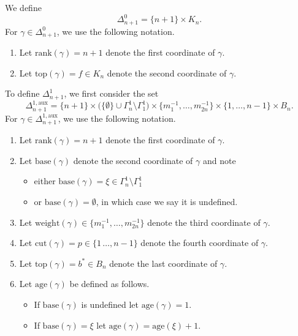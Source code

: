 \documentclass[11pt]{amsart}
\theoremstyle{definition}
\numberwithin{equation}{section}
\begin{document}
We define
\[\Delta_{n+1}^0 = \{n+1\}\times K_n.\]
For $\gamma\in\Delta_{n+1}^0$, we use the following notation.
\begin{enumerate}[label=(\arabic*)]

\item Let $\mathrm{rank}(\gamma) = n+1$ denote the first coordinate of $\gamma$.

\item Let $\mathrm{top}(\gamma) = f\in K_n$ denote the second coordinate of $\gamma$.

\end{enumerate}

To define $\Delta_{n+1}^1$, we first consider the set
\[\Delta_{n+1}^{1,\mathrm{aux}} = \{n+1\}\times \big(\{\emptyset\}\cup\Gamma^1_n\setminus\Gamma_1^1\big)\times\{m^{-1}_1,\ldots,m^{-1}_{2n}\}\times \{1,\dots,n-1\}\times B_n.\]
For $\gamma\in\Delta_{n+1}^{1,\mathrm{aux}}$, we use the following notation.
\begin{enumerate}[label=(\arabic*),resume]
    
    \item Let $\mathrm{rank}(\gamma) = n+1$ denote the first coordinate of $\gamma$.
    
    \item Let $\mathrm{base}(\gamma)$ denote the second coordinate of $\gamma$ and note
    \begin{itemize}
        \item either $\mathrm{base}(\gamma)=\xi\in\Gamma^1_n\setminus\Gamma_1^1$
        \item or $\mathrm{base}(\gamma) = \emptyset$, in which case we say it is undefined.
    \end{itemize}   
    
    \item Let $\mathrm{weight}(\gamma)\in\{m^{-1}_1,\ldots,m^{-1}_{2n}\}$ denote the third coordinate of $\gamma$.

    \item Let $\mathrm{cut}(\gamma) = p\in\{1\,\ldots,n-1\}$ denote the fourth coordinate of $\gamma$.

    \item Let $\mathrm{top}(\gamma) = b^*\in B_n$ denote the last coordinate of $\gamma$.

    \item Let $\mathrm{age}(\gamma)$ be defined as follows.
    \begin{itemize}
        \item If $\mathrm{base}(\gamma)$ is undefined let $\mathrm{age}(\gamma) = 1$.
        \item If $\mathrm{base}(\gamma) = \xi$ let $\mathrm{age}(\gamma) =\mathrm{age}(\xi)+ 1$.
    \end{itemize}        
\end{enumerate}
\end{document}
